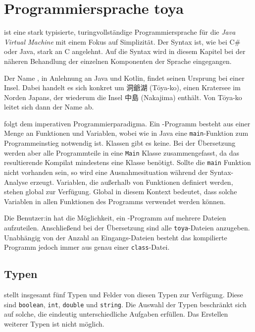 \chapter{Programmiersprache toya}
\label{cha:toya}

\Toya ist eine stark typisierte, turing\-vollständige Programmiersprache für die \textit{Java Virtual Machine} mit einem Fokus auf Simplizität. Der Syntax ist, wie bei C\# oder Java, stark an C angelehnt. Auf die Syntax wird in diesem Kapitel bei der näheren Behandlung der einzelnen Komponenten der Sprache eingegangen. 

\begin{CJK}{UTF8}{ipxm}
Der Name \toya, in Anlehnung an Java und Kotlin, findet seinen Ursprung bei einer Insel. Dabei handelt es sich konkret um 洞爺湖 (Tōya-ko), einen Kratersee im Norden Japans, der wiederum die Insel 中島 (Nakajima) enthält. Von Tōya-ko leitet sich dann der Name \toya ab.
\end{CJK}

\Toya folgt dem imperativen Programmierparadigma. Ein \toya-Programm besteht aus einer Menge an Funktionen und Variablen, wobei wie in Java eine \texttt{main}-Funktion zum Programmeinstieg notwendig ist. Klassen gibt es keine. Bei der Übersetzung werden aber alle Programmteile in eine \texttt{Main} Klasse zusammengefasst, da das resultierende Kompilat mindestens eine Klasse benötigt. Sollte die \texttt{main} Funktion nicht vorhanden sein, so wird eine Ausnahmesituation während der Syntax-Analyse erzeugt. Variablen, die außerhalb von Funktionen definiert werden, stehen global zur Verfügung. Global in diesem Kontext bedeutet, dass solche Variablen in allen Funktionen des Programms verwendet werden können.

Die Benutzer:in hat die Möglichkeit, ein \toya-Programm auf mehrere Dateien aufzuteilen. Anschließend bei der Übersetzung sind alle \texttt{toya}-Dateien anzugeben. Unabhängig von der Anzahl an Eingangs-Dateien besteht das kompilierte Programm jedoch immer aus genau einer \texttt{class}-Datei.  

\section{Typen}

\Toya stellt insgesamt fünf Typen und Felder von diesen Typen zur Verfügung. Diese sind \texttt{boolean}, \texttt{int}, \texttt{double} und \texttt{string}. Die Auswahl der Typen beschränkt sich auf solche, die eindeutig unterschiedliche Aufgaben erfüllen. Das Erstellen weiterer Typen ist nicht möglich.

